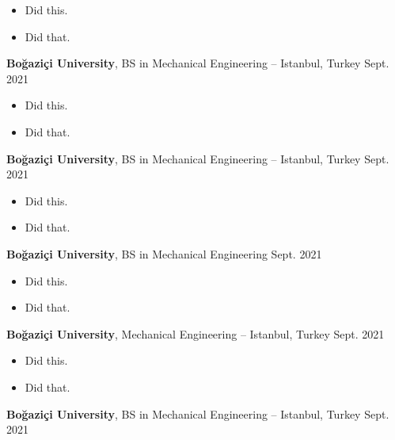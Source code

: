 \documentclass[10pt, letterpaper]{article}
\newenvironment{highlights}{
        \begin{itemize}[
                topsep=0pt,
                partopsep=0pt,
                itemsep=0pt,
                leftmargin=10pt
            ]
    }{
        \end{itemize}
    } %
\begin{document}
        \begin{highlights}
        \item Did this.
        \item Did that.
        \end{highlights}


        \vspace{8pt}

        \textbf{Boğaziçi University}, BS in Mechanical Engineering -- Istanbul, Turkey \hfill Sept. 2021

        \begin{highlights}
        \item Did this.
        \item Did that.
        \end{highlights}


        \vspace{8pt}

        \textbf{Boğaziçi University}, BS in Mechanical Engineering -- Istanbul, Turkey \hfill Sept. 2021

        \begin{highlights}
        \item Did this.
        \item Did that.
        \end{highlights}


        \vspace{8pt}

        \textbf{Boğaziçi University}, BS in Mechanical Engineering \hfill Sept. 2021

        \begin{highlights}
        \item Did this.
        \item Did that.
        \end{highlights}


        \vspace{8pt}

        \textbf{Boğaziçi University}, Mechanical Engineering -- Istanbul, Turkey \hfill Sept. 2021

        \begin{highlights}
        \item Did this.
        \item Did that.
        \end{highlights}


        \vspace{8pt}

        \textbf{Boğaziçi University}, BS in Mechanical Engineering -- Istanbul, Turkey \hfill Sept. 2021
\end{document}
